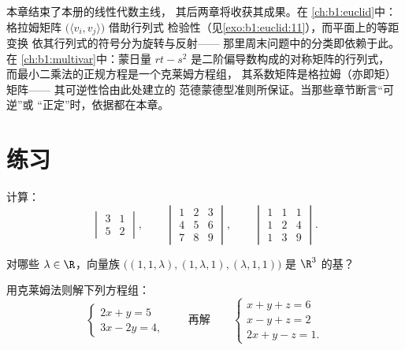 \begin{remark}[第 3 册内的展望]
\label{rem:b1:det:perspectives}
本章结束了本册的线性代数主线，
其后两章将收获其成果。在
\cref{ch:b1:euclid}中：格拉姆矩阵
$\bigl(\langle v_i, v_j\rangle\bigr)$ 借助行列式
检验性（见\cref{exo:b1:euclid:11}），而平面上的等距变换
依其行列式的符号分为旋转与反射——
那里周末问题中的分类即依赖于此。在
\cref{ch:b1:multivar}中：蒙日量 $rt -
s^2$ 是二阶偏导数构成的对称矩阵的行列式，
而最小二乘法的正规方程是一个克莱姆方程组，
其系数矩阵是格拉姆（亦即矩）矩阵——
其可逆性恰由此处建立的
范德蒙德型准则所保证。当那些章节断言“可逆”或
“正定”时，依据都在本章。
\end{remark}

\section{练习}

\begin{exercise}[$\star$]\label{exo:b1:det:1}
计算：
\[
\begin{vmatrix} 3 & 1\\ 5 & 2 \end{vmatrix},
\qquad
\begin{vmatrix} 1 & 2 & 3\\ 4 & 5 & 6\\ 7 & 8 & 9\end{vmatrix},
\qquad
\begin{vmatrix} 1 & 1 & 1\\ 1 & 2 & 4\\ 1 & 3 & 9\end{vmatrix}.
\]
\end{exercise}

\begin{exercise}[$\star$]\label{exo:b1:det:2}
对哪些 $\lambda \in \R$，向量族 $\bigl((1, 1, \lambda),
(1, \lambda, 1), (\lambda, 1, 1)\bigr)$ 是 $\R^3$ 的基？
\end{exercise}

\begin{exercise}[$\star$]\label{exo:b1:det:3}
用克莱姆法则解下列方程组：
\[
\begin{cases}
2x + y = 5\\
3x - 2y = 4 ,
\end{cases}
\qquad\text{再解}\qquad
\begin{cases}
x + y + z = 6\\
x - y + z = 2\\
2x + y - z = 1 .
\end{cases}
\]
\end{exercise}

